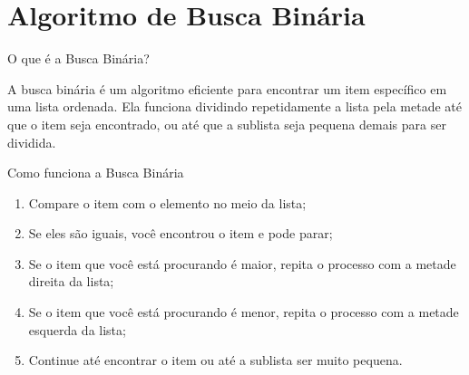 \section{Algoritmo de Busca Binária}

\begin{frame}{O que é a Busca Binária?}

A busca binária é um algoritmo eficiente para encontrar um item específico em
uma lista ordenada. Ela funciona dividindo repetidamente a lista pela metade até
que o item seja encontrado, ou até que a sublista seja pequena demais para ser
dividida.

\end{frame}

\begin{frame}{Como funciona a Busca Binária}
    \begin{enumerate}
        \item Compare o item com o elemento no meio da lista;
        \item Se eles são iguais, você encontrou o item e pode parar;
        \item Se o item que você está procurando é maior, repita o processo com
              a metade direita da lista;
        \item Se o item que você está procurando é menor, repita o processo com
              a metade esquerda da lista;
        \item Continue até encontrar o item ou até a sublista ser muito pequena.
    \end{enumerate}
\end{frame}
